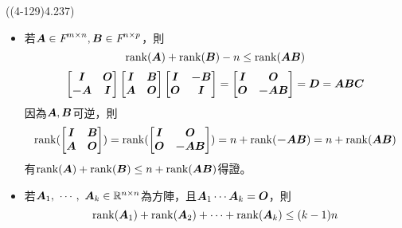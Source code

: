 \item \begin{theorem}{((4-129)4.237)} \begin{itemize}
		\item 若$\boldsymbol{A} \in \textit{F}^{m \times n}, \boldsymbol{B} \in \textit{F}^{n \times p}$，則 \begin{equation}
			\operatorname{rank}(\boldsymbol{A}) + \operatorname{rank}(\boldsymbol{B}) - n \le \operatorname{rank}(\boldsymbol{AB})
		\end{equation}\begin{equation}
			\begin{bmatrix}
				\boldsymbol{I} & \boldsymbol{O} \\
				\boldsymbol{-A} & \boldsymbol{I}
			\end{bmatrix}
			\begin{bmatrix}
				\boldsymbol{I} & \boldsymbol{B} \\
				\boldsymbol{A} & \boldsymbol{O}
			\end{bmatrix}
			\begin{bmatrix}
				\boldsymbol{I} & \boldsymbol{-B} \\
				\boldsymbol{O} & \boldsymbol{I}
			\end{bmatrix} = 
			\begin{bmatrix}
				\boldsymbol{I} & \boldsymbol{O} \\
				\boldsymbol{O} & \boldsymbol{-AB}
			\end{bmatrix} = \boldsymbol{D} = \boldsymbol{A}\boldsymbol{B}\boldsymbol{C}
		\end{equation} 因為$\boldsymbol{A}, \boldsymbol{B}$可逆，則\begin{equation}
			\operatorname{rank}(\begin{bmatrix}
				\boldsymbol{I} & \boldsymbol{B} \\
				\boldsymbol{A} & \boldsymbol{O}
			\end{bmatrix}) = 
			\operatorname{rank}(\begin{bmatrix}
				\boldsymbol{I} & \boldsymbol{O} \\
				\boldsymbol{O} & \boldsymbol{-AB}
			\end{bmatrix}) = n + \operatorname{rank}(\boldsymbol{-AB}) = n + \operatorname{rank}(\boldsymbol{AB})
		\end{equation} 有$\operatorname{rank}(\boldsymbol{A}) + \operatorname{rank}(\boldsymbol{B}) \le n + \operatorname{rank}(\boldsymbol{AB})$得證。
		\item 若$\boldsymbol{A}_1, \ \cdots, \ \boldsymbol{A}_k \in \mathbb{R}^{n \times n}$為方陣，且$\boldsymbol{A}_1\cdots\boldsymbol{A}_k = \boldsymbol{O}$，則\begin{equation}
			\operatorname{rank}(\boldsymbol{A}_1) + \operatorname{rank}(\boldsymbol{A}_2) + \cdots + \operatorname{rank}(\boldsymbol{A}_k) \le (k - 1)n 
		\end{equation} 
	\end{itemize}
\end{theorem}

